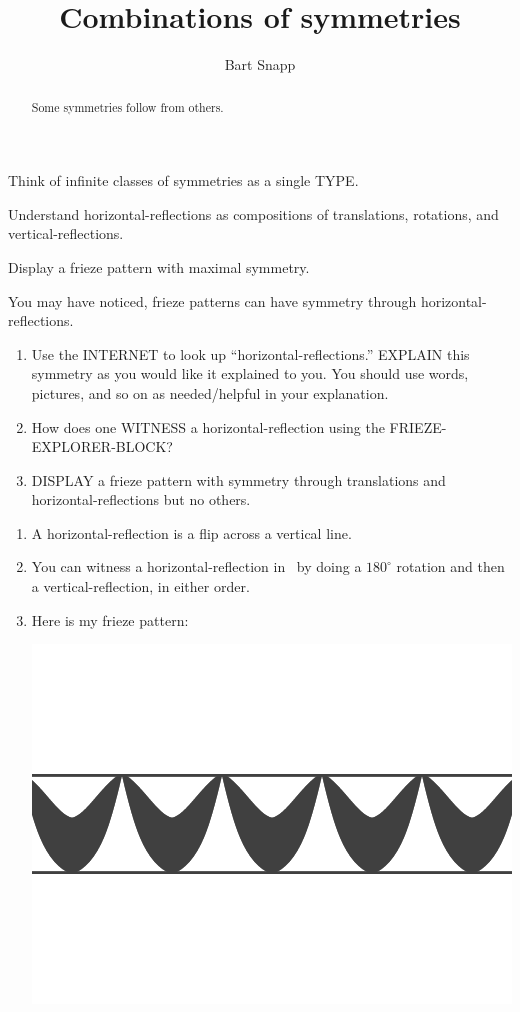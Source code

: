 \documentclass[noauthor,nooutcomes,hints,handout]{ximera}
\author{Bart Snapp}
\title{Combinations of symmetries}
\begin{document}
\begin{abstract}
  Some symmetries follow from others. 
\end{abstract}
\maketitle

\begin{listOutcomes}
\item Think of infinite classes of symmetries as a single TYPE.
\item Understand horizontal-reflections as compositions of
  translations, rotations, and vertical-reflections.
\item Display a frieze pattern with maximal symmetry.
\end{listOutcomes}
\mynewpage

\begin{question}
  You may have noticed, frieze patterns can have symmetry through
  horizontal-reflections.
  \begin{enumerate}
  \item Use the INTERNET to look up ``horizontal-reflections.''
    EXPLAIN this symmetry as you would like it explained to you. You
    should use words, pictures, and so on as needed/helpful in your
    explanation.
  \item How does one WITNESS a horizontal-reflection using the
    FRIEZE-EXPLORER-BLOCK?
  \item DISPLAY a frieze pattern with symmetry through translations
    and horizontal-reflections but no others.
  \end{enumerate}
  \begin{freeResponse}
    \begin{enumerate}
    \item A horizontal-reflection is a flip across a vertical line.
    \item You can witness a horizontal-reflection in \snap\ by doing a
      $180^\circ$ rotation and then a vertical-reflection, in either
      order.
    \item Here is my frieze pattern:
      \begin{center}
        \includegraphics[width=.6\textwidth]{ansFv.png}
      \end{center}
    \end{enumerate}
  \end{freeResponse}
\end{question}
\mynewpage
\end{document}
